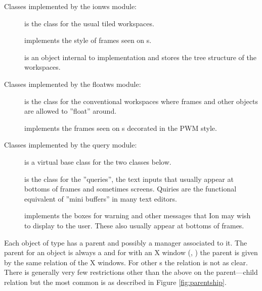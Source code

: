 Classes implemented by the ionws module:

\begin{description}
  \item[] is the class for the
    usual tiled workspaces.
  \item[] implements the
    style of frames seen on s.
  \item[] is an object internal to
     implementation and stores the tree structure of the
    workspaces.
\end{description}


Classes implemented by the floatws module:

\begin{description}
  \item[] is the class for the
    conventional workspaces where frames and other objects are
    allowed to ''float'' around.
  \item[] implements the
    frames seen on s decorated in the PWM style.
\end{description}


Classes implemented by the query module:

\begin{description}
  \item[] is a virtual base class for the
    two classes below.
  \item[] is the class for the ''queries'',
    the text inputs that usually appear at bottoms of frames and sometimes
    screens. Quiries are the functional equivalent of ''mini buffers'' in
    many text editors.
  \item[] implements the boxes for 
    warning and other messages that Ion may wish to display to the user. 
    These also usually appear at bottoms of frames.
\end{description}



Each object of type  has a parent and possibly a manager
associated to it. The parent for an object is always a 
 and for  with an X window (,
) the parent  is given by the same relation of
the X windows. For other s the relation is not as clear.
There is generally very few restrictions other than the above on the
parent---child relation but the most common is as described in
Figure \ref{fig:parentship}.

